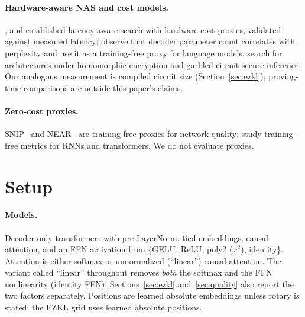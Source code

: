 \documentclass[10pt]{article}
\begin{document}
\paragraph{Hardware-aware NAS and cost models.}
\citet{cai2019proxylessnas}, \citet{tan2019mnasnet} and \citet{wu2019fbnet}
established latency-aware search with hardware cost proxies, validated against
measured latency; \citet{javaheripi2022lts} observe that decoder parameter count
correlates with perplexity and use it as a training-free proxy for language
models. \citet{nass2020} search for architectures under homomorphic-encryption and
garbled-circuit secure inference. Our analogous measurement is compiled circuit size
(Section~\ref{sec:ezkl}); proving-time comparisons are outside this paper's
claims.

\paragraph{Zero-cost proxies.}
SNIP~\citep{lee2019snip} and NEAR~\citep{husistein2025near} are training-free
proxies for network quality; \citet{serianni2023understanding} study
training-free metrics for RNNs and transformers. We do not evaluate proxies.

\section{Setup}
\label{sec:setup}

\paragraph{Models.}
Decoder-only transformers with pre-LayerNorm, tied embeddings, causal attention,
and an FFN activation from \{GELU, ReLU, poly2 ($x^2$), identity\}. Attention is
either softmax or unnormalized (``linear'') causal attention. The variant called
``linear'' throughout removes \emph{both} the softmax and the FFN nonlinearity
(identity FFN); Sections~\ref{sec:ezkl} and~\ref{sec:quality} also report the two
factors separately. Positions are learned absolute embeddings unless rotary is
stated; the EZKL grid uses learned absolute positions.
\end{document}
